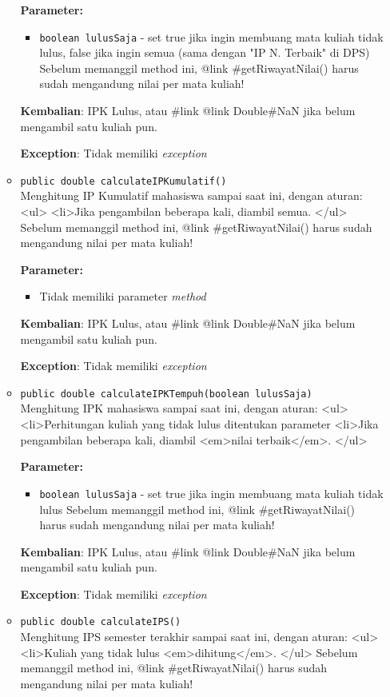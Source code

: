 \documentclass{article}
\begin{document}
\begin{enumerate}
\begin{itemize}
\textbf{Parameter:}
\begin{itemize}
\item \texttt{boolean lulusSaja} - 
set true jika ingin membuang mata kuliah tidak lulus, false jika ingin semua (sama dengan "IP N. Terbaik" di DPS)
 Sebelum memanggil method ini, {@link #getRiwayatNilai()} harus sudah mengandung nilai per mata kuliah!
\end{itemize}
\textbf{Kembalian}: IPK Lulus, atau {#link {@link Double#NaN}} jika belum mengambil satu kuliah pun.

\textbf{Exception}: Tidak memiliki \textit{exception}

\item \texttt{public double calculateIPKumulatif()}\\ 
Menghitung IP Kumulatif mahasiswa sampai saat ini, dengan aturan:
 <ul>
   <li>Jika pengambilan beberapa kali, diambil semua.
 </ul>
 Sebelum memanggil method ini, {@link #getRiwayatNilai()} harus sudah mengandung nilai per mata kuliah!

\textbf{Parameter:}\begin{itemize}
\item Tidak memiliki parameter \textit{method}
\end{itemize}
\textbf{Kembalian}: IPK Lulus, atau {#link {@link Double#NaN}} jika belum mengambil satu kuliah pun.

\textbf{Exception}: Tidak memiliki \textit{exception}

\item \texttt{public double calculateIPKTempuh(boolean lulusSaja)}\\ 
Menghitung IPK mahasiswa sampai saat ini, dengan aturan:
 <ul>
   <li>Perhitungan kuliah yang tidak lulus ditentukan parameter
   <li>Jika pengambilan beberapa kali, diambil <em>nilai terbaik</em>.
 </ul>

\textbf{Parameter:}
\begin{itemize}
\item \texttt{boolean lulusSaja} - 
set true jika ingin membuang mata kuliah tidak lulus 
 Sebelum memanggil method ini, {@link #getRiwayatNilai()} harus sudah mengandung nilai per mata kuliah!
\end{itemize}
\textbf{Kembalian}: IPK Lulus, atau {#link {@link Double#NaN}} jika belum mengambil satu kuliah pun.

\textbf{Exception}: Tidak memiliki \textit{exception}

\item \texttt{public double calculateIPS()}\\ 
Menghitung IPS semester terakhir sampai saat ini, dengan aturan:
 <ul>
   <li>Kuliah yang tidak lulus <em>dihitung</em>.
 </ul>
 Sebelum memanggil method ini, {@link #getRiwayatNilai()} harus sudah mengandung nilai per mata kuliah!


\end{itemize}
\end{enumerate}
\end{document}
